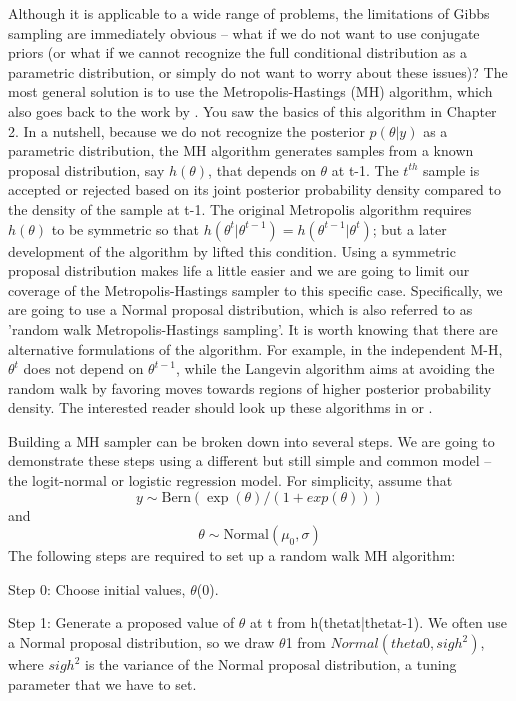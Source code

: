 Although it is applicable to a wide range of problems, the limitations
of Gibbs sampling are immediately obvious – what if we do not want to
use conjugate priors (or what if we cannot recognize the full
conditional distribution as a parametric distribution, or simply do
not want to worry about these issues)? The most general solution is to
use the Metropolis-Hastings (MH) algorithm, which also goes back to
the work by \citet{metropolis_ulam:1953}. You saw the basics of this
algorithm in Chapter 2. In a nutshell, because we do not recognize the
posterior $p(\theta|y)$ as a parametric distribution, the MH algorithm
generates samples from a known proposal distribution, say $h(\theta)$,
that depends on $\theta$ at t-1. The $t^{th}$ sample is accepted or
rejected based on its joint posterior probability density compared to
the density of the sample at t-1. The original Metropolis algorithm
requires $h(\theta)$ to be symmetric so that
$h(\theta^{t}|\theta^{t-1}) = h(\theta^{t-1}|\theta^{t})$; but a later
development of the algorithm by \citet{hastings:1970} lifted this
condition. Using a symmetric proposal distribution makes life a little
easier and we are going to limit our coverage of the
Metropolis-Hastings sampler to this specific case. Specifically, we
are going to use a Normal proposal distribution, which is also
referred to as 'random walk Metropolis-Hastings sampling'. It is worth
knowing that there are alternative formulations of the algorithm. For
example, in the independent M-H, $\theta^{t}$ does not depend on
$\theta^{t-1}$, while the Langevin algorithm \citep{roberts_etal:1998}
aims at avoiding the random walk by favoring moves towards regions of
higher posterior probability density. The interested reader should
look up these algorithms in \citet{robert_casella:2004} or
\citet{robert_casella:2010}.

Building a MH sampler can be broken down into several steps. We are going to demonstrate these steps using a different but still simple and common model – the logit-normal or logistic regression model. For simplicity, assume that 
\[
y \sim \mbox{Bern}(\exp(\theta)/(1+ exp(\theta)))
\]
and 
\[ 
\theta \sim \mbox{Normal}(\mu_0, \sigma)
\]
The following steps are required to set up a random walk MH algorithm:

{\flushleft Step 0: Choose initial values, $\theta$(0).}

{\flushleft Step 1: Generate a proposed value of $\theta$ at t from h(thetat|thetat-1). }
We often use a Normal proposal distribution, so we draw $\theta$1 from $Normal(theta0, sigh^2)$, where $sigh^2$ is the variance of the Normal proposal distribution, a tuning parameter  that we have to set. 

